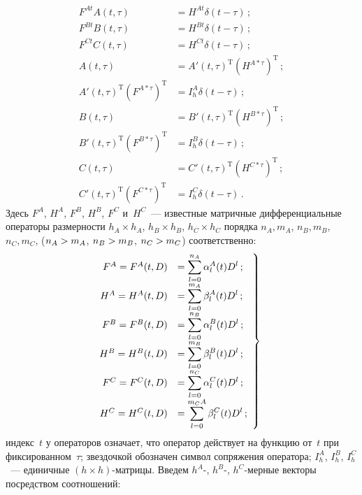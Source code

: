 \begin{multicols}{2}
\noindent
    \begin{align*}
    F^{At}A(t,\tau) &= H^{At} \delta (t-\tau)\,;\\
    F^{Bt}B(t,\tau) &= H^{Bt} \delta (t-\tau)\,;\\
    F^{Ct}C(t,\tau) &= H^{Ct} \delta (t-\tau)\,;\\
    A(t,\tau)&= A'(t,\tau)^{\mathrm{T}} (H^{A*\tau})^{\mathrm{T}}\,;
\\
    A'(t,\tau)^{\mathrm{T}} (F^{A*\tau})^{\mathrm{T}}&=    I_h^A\delta(t-\tau)\,;\\
B(t,\tau)&= B'(t,\tau)^{\mathrm{T}} (H^{B*\tau})^{\mathrm{T}}\,;\\
    B'(t,\tau)^{\mathrm{T}} (F^{B*\tau})^{\mathrm{T}}&= I_h^B\delta(t-\tau)\,;
\\
    C(t,\tau)&= C'(t,\tau)^{\mathrm{T}} (H^{C*\tau})^{\mathrm{T}}\,;\\
    C'(t,\tau)^{\mathrm{T}} (F^{C*\tau})^{\mathrm{T}}&= I_h^C\delta(t-\tau)\,.
    \end{align*}
Здесь $F^A$, $H^A$, $F^B$, $H^B$, $F^C$ и~$H^C$~---
известные матричные дифференциальные операторы размерности
$h_A\times h_A$, $h_B\times h_B$, $h_C\times h_C$ порядка $n_A,
m_A$, $n_B, m_B$, $n_C, m_C$, ($n_A\hm>m_A$, $n_B\hm>m_B$, $n_C\hm>m_C$)
соответственно:
\begin{equation}
\hspace*{-3.8mm}\left.
\begin{array}{rl}
F^A = F^A (t,D)&=\displaystyle\sss_{l=0}^{n_A} \alp_l^A (t) D^l\,;\\[9pt]
H^A=H^A(t,D) &=\displaystyle\sss_{l=0}^{m_A} \beta_l^A (t) D^l\,;
\\[9pt]
F^B = F^B (t,D)&=\displaystyle\sss_{l=0}^{n_B} \alp_l^B (t) D^l\,;
\\[9pt]
    H^B=H^B(t,D) &=\displaystyle\sss_{l=0}^{m_B} \beta_l^B (t) D^l\,;
\\[9pt]
F^C = F^C (t,D)&=\displaystyle\sss_{l=0}^{n_C} \alp_l^C (t) D^l\,;
\\[9pt]
    H^C=H^C(t,D) &=\displaystyle\sss_{l=0}^{m_CA} \beta_l^C (t) D^l\,;
    \end{array}
    \right\}\!
     \label{e4.11-s}
    \end{equation}
индекс~$t$ у операторов означает, что оператор
действует на функцию от~$t$ при фиксированном~$\tau$; звездочкой
обозначен символ сопряжения оператора; $I_h^A$, $I_h^B$, $I_h^C$~---
единичные $(h\times h)$-мат\-ри\-цы. Введем $h^A$-, $h^B$-, $h^C$-мер\-ные
векторы посредством соотношений:

\end{multicols}

